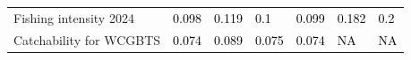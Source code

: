 \documentclass[
]{scrartcl}
\begin{document}
\begin{landscape}
\begin{longtable}[t]{ll>{\raggedright\arraybackslash}p{5em}>{\raggedright\arraybackslash}p{5em}>{\raggedright\arraybackslash}p{5em}>{\raggedright\arraybackslash}p{5em}>{\raggedright\arraybackslash}p{5em}}
\hspace{1em}Fishing intensity 2024 & \textcolor{black}{0.098} & \textcolor{black}{0.119} & \textcolor{black}{0.1} & \textcolor{black}{0.099} & \textcolor{black}{0.182} & \textcolor{black}{0.2}\\
\hspace{1em}Catchability for WCGBTS & \textcolor{black}{0.074} & \textcolor{black}{0.089} & \textcolor{black}{0.075} & \textcolor{black}{0.074} & \textcolor{black}{NA} & \textcolor{black}{NA}\\
\bottomrule

\end{longtable}

\endgroup{}


\end{landscape}

\newpage{}
\end{document}
